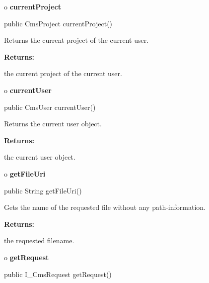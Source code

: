 o {\bf currentProject} 

\begin{PRE}
 public CmsProject currentProject()
\end{PRE}

\begin{description}
\htmlDD Returns the current project of the current user. 

\begin{description}
\item {\bf Returns:}  

the current project of the current user.  
\end{description}

\end{description}

o {\bf currentUser} 

\begin{PRE}
 public CmsUser currentUser()
\end{PRE}

\begin{description}
\htmlDD Returns the current user object. 

\begin{description}
\item {\bf Returns:}  

the current user object.  
\end{description}

\end{description}

o {\bf getFileUri} 

\begin{PRE}
 public String getFileUri()
\end{PRE}

\begin{description}
\htmlDD Gets the name of the requested file without any path-information. 

\begin{description}
\item {\bf Returns:}  

the requested filename.  
\end{description}

\end{description}

o {\bf getRequest} 

\begin{PRE}
 public I\_CmsRequest getRequest()
\end{PRE}

